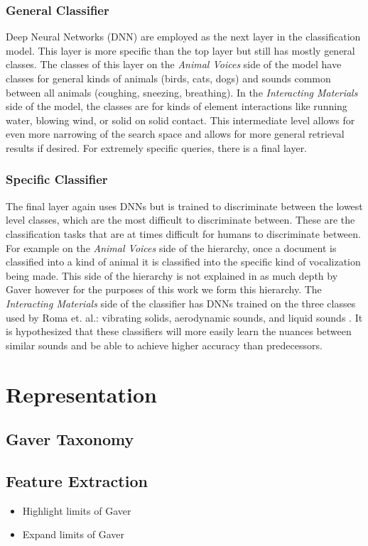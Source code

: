 \subsubsection{General Classifier}
Deep Neural Networks (DNN) are employed as the next layer in the classification model. This layer is more specific than the top layer but still has mostly general classes. The classes of this layer on the \textit{Animal Voices} side of the model have classes for general kinds of animals (birds, cats, dogs) and sounds common between all animals (coughing, sneezing, breathing). In the \textit{Interacting Materials} side of the model, the classes are for kinds of element interactions like running water, blowing wind, or solid on solid contact. This intermediate level allows for even more narrowing of the search space and allows for more general retrieval results if desired. For extremely specific queries, there is a final layer.

\subsubsection{Specific Classifier}
The final layer again uses DNNs but is trained to discriminate between the lowest level classes, which are the most difficult to discriminate between. These are the classification tasks that are at times difficult for humans to discriminate between. For example on the \textit{Animal Voices} side of the hierarchy, once a document is classified into a kind of animal it is classified into the specific kind of vocalization being made. This side of the hierarchy is not explained in as much depth by Gaver however for the purposes of this work we form this hierarchy. The \textit{Interacting Materials} side of the classifier has DNNs trained on the three classes used by Roma et. al.: vibrating solids, aerodynamic sounds, and liquid sounds \cite{Roma2010}. It is hypothesized that these classifiers will more easily learn the nuances between similar sounds and be able to achieve higher accuracy than predecessors.

\section{Representation}

\subsection{Gaver Taxonomy}

\subsection{Feature Extraction}
\begin{itemize}
    \item Highlight limits of Gaver
    \item Expand limits of Gaver
\end{itemize}

